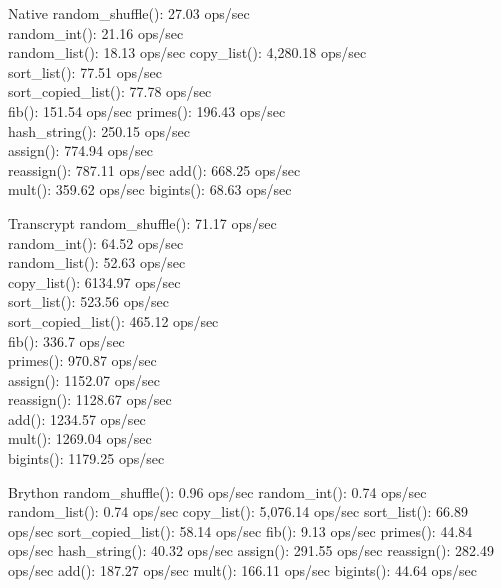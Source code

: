 \label{notes__03010-python-web.md}
\begin{frame}{Native}
\label{notes__03010-python-web.md__native}
random\_shuffle(): 27.03 ops/sec\\
random\_int(): 21.16 ops/sec\\
random\_list(): 18.13 ops/sec
copy\_list(): 4,280.18 ops/sec\\
sort\_list(): 77.51 ops/sec\\
sort\_copied\_list(): 77.78 ops/sec\\
fib(): 151.54 ops/sec
primes(): 196.43 ops/sec\\
hash\_string(): 250.15 ops/sec\\
assign(): 774.94 ops/sec\\
reassign(): 787.11 ops/sec
add(): 668.25 ops/sec\\
mult(): 359.62 ops/sec
bigints(): 68.63 ops/sec
\end{frame}

\begin{frame}{Transcrypt}
\label{notes__03010-python-web.md__transcrypt}
random\_shuffle(): 71.17 ops/sec\\
random\_int(): 64.52 ops/sec\\
random\_list(): 52.63 ops/sec\\
copy\_list(): 6134.97 ops/sec\\
sort\_list(): 523.56 ops/sec\\
sort\_copied\_list(): 465.12 ops/sec\\
fib(): 336.7 ops/sec\\
primes(): 970.87 ops/sec\\
assign(): 1152.07 ops/sec\\
reassign(): 1128.67 ops/sec\\
add(): 1234.57 ops/sec\\
mult(): 1269.04 ops/sec\\
bigints(): 1179.25 ops/sec
\end{frame}

\begin{frame}{Brython}
\label{notes__03010-python-web.md__brython}
random\_shuffle(): 0.96 ops/sec
random\_int(): 0.74 ops/sec
random\_list(): 0.74 ops/sec
copy\_list(): 5,076.14 ops/sec
sort\_list(): 66.89 ops/sec
sort\_copied\_list(): 58.14 ops/sec
fib(): 9.13 ops/sec
primes(): 44.84 ops/sec
hash\_string(): 40.32 ops/sec
assign(): 291.55 ops/sec
reassign(): 282.49 ops/sec
add(): 187.27 ops/sec
mult(): 166.11 ops/sec
bigints(): 44.64 ops/sec
\end{frame}

